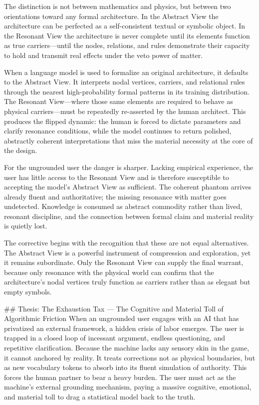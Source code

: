 The distinction is not between mathematics and physics, but between two orientations toward any formal architecture. In the Abstract View the architecture can be perfected as a self-consistent textual or symbolic object. In the Resonant View the architecture is never complete until its elements function as true carriers—until the nodes, relations, and rules demonstrate their capacity to hold and transmit real effects under the veto power of matter.

When a language model is used to formalize an original architecture, it defaults to the Abstract View. It interprets nodal vertices, carriers, and relational rules through the nearest high-probability formal patterns in its training distribution. The Resonant View—where those same elements are required to behave as physical carriers—must be repeatedly re-asserted by the human architect. This produces the flipped dynamic: the human is forced to dictate parameters and clarify resonance conditions, while the model continues to return polished, abstractly coherent interpretations that miss the material necessity at the core of the design.

For the ungrounded user the danger is sharper. Lacking empirical experience, the user has little access to the Resonant View and is therefore susceptible to accepting the model’s Abstract View as sufficient. The coherent phantom arrives already fluent and authoritative; the missing resonance with matter goes undetected. Knowledge is consumed as abstract commodity rather than lived, resonant discipline, and the connection between formal claim and material reality is quietly lost.

The corrective begins with the recognition that these are not equal alternatives. The Abstract View is a powerful instrument of compression and exploration, yet it remains subordinate. Only the Resonant View can supply the final warrant, because only resonance with the physical world can confirm that the architecture’s nodal vertices truly function as carriers rather than as elegant but empty symbols.

## Thesis: The Exhaustion Tax — The Cognitive and Material Toll of Algorithmic Friction
When an ungrounded user engages with an AI that has privatized an external framework, a hidden crisis of labor emerges. The user is trapped in a closed loop of incessant argument, endless questioning, and repetitive clarification.
Because the machine lacks any sensory skin in the game, it cannot anchored by reality. It treats corrections not as physical boundaries, but as new vocabulary tokens to absorb into its fluent simulation of authority. This forces the human partner to bear a heavy burden. The user must act as the machine's external grounding mechanism, paying a massive cognitive, emotional, and material toll to drag a statistical model back to the truth.

